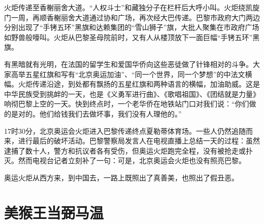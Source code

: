 \documentclass[12pt,UTF-8,openany]{ctexbook}
\begin{document}
\begin{Large}
    火炬传递至香榭丽舍大道。“人权斗士”和藏独分子在栏杆后大呼小叫。火炬绕凯旋门一周，再顺香榭丽舍大道通过协和广场，再次经大巴传递。巴黎市政府大门两边分别出现了“手铐五环”黑旗和达赖集团的“雪山狮子”旗，大批人聚集在市政府广场如野兽般嚎叫。火炬从巴黎圣母院前时，又有人从楼顶放下一面巨幅“手铐五环”黑旗。
    
    有黑暗就有光明，在法国的留学生和爱国华侨向这些恶徒做了针锋相对的斗争。大家高举五星红旗和写有“北京奥运加油”、“同一个世界，同一个梦想”的中法文横幅。火炬传递沿途，到处都有飘扬的五星红旗和两种语言的横幅，加油助威。这是中华民族受到挑衅的一天，也是《义勇军进行曲》、《歌唱祖国》、《团结就是力量》响彻巴黎上空的一天。快到终点时，一个老华侨在地铁站门口对我们说：“你们做的是对的。他们给钱我们去做坏事，我们没有人理他的。”
    
    17时30分，北京奥运会火炬进入巴黎传递终点夏勒蒂体育场。一些人仍然追随而来，进行最后的破坏活动。巴黎警察局发言人在电视直播上总结一天的过程：虽然逮捕了数十人，警方和抗议者各有受伤，但奥运火炬跑完全程，没有被抢走或扑灭。然而电视台记者立刻补了一句：可是，北京奥运会火炬也没有照亮巴黎。
    
    奥运火炬从西方来，到中国去，一路上既照出了真善美，也照出了假丑恶。
    
\end{Large}

\chapter{美猴王当弼马温}
\end{document}
